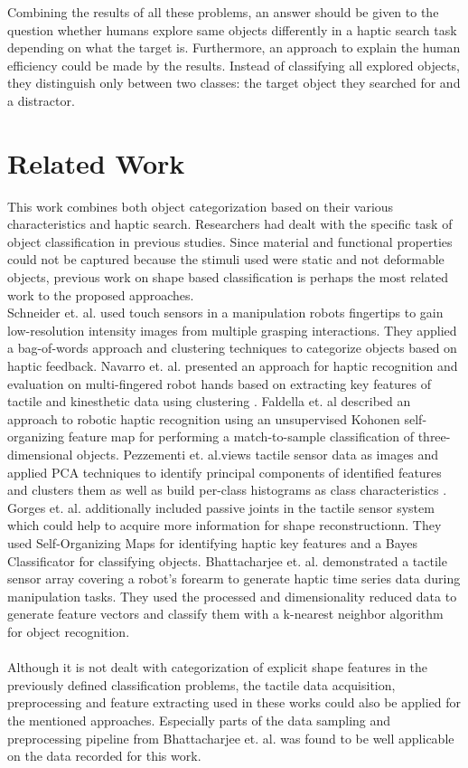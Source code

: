 Combining the results of all these problems, an answer should be given to the question whether humans explore same objects differently in a haptic search task depending on what the target is. Furthermore, an approach to explain the human efficiency could be made by the results. Instead of classifying all explored objects, they distinguish only between two classes: the target object they searched for and a distractor.      
\section{Related Work}
This work combines both object categorization based on their various characteristics and haptic search. Researchers had dealt with the specific task of object classification in previous studies. Since material and functional properties could not be captured because the stimuli used were static and not deformable objects, previous work on shape based classification is perhaps the most related work to the proposed approaches.\\
Schneider et. al. \cite{Schneider} used touch sensors in a manipulation robots fingertips to gain low-resolution intensity images from multiple grasping interactions. They applied a bag-of-words approach and clustering techniques to categorize objects based on haptic feedback. Navarro et. al. presented an approach for haptic recognition and evaluation on multi-fingered robot hands based on extracting key features of tactile and kinesthetic data using clustering \cite{Navarro}. Faldella et. al \cite{Faldella} described an approach to robotic haptic recognition using an unsupervised Kohonen self-organizing feature map for performing a match-to-sample classification of three-dimensional objects. Pezzementi et. al.views tactile sensor data as images and applied PCA techniques to identify principal components of identified features and clusters them as well as build per-class histograms as class characteristics \cite{Pezzementi}. Gorges et. al. \cite{Gorges} additionally included passive joints in the tactile sensor system which could help to acquire more information for shape reconstructionn. They used Self-Organizing Maps for identifying haptic key features and a Bayes Classificator for classifying objects. Bhattacharjee et. al. \cite{Bhattacharjee} demonstrated a tactile sensor array covering a robot's forearm to generate haptic time series data during manipulation tasks. They used the processed and dimensionality reduced data to generate feature vectors and classify them with a k-nearest neighbor algorithm for object recognition.
\\\\
Although it is not dealt with categorization of explicit shape features in the previously defined classification problems, the tactile data acquisition, preprocessing and feature extracting used in these works could also be applied for the mentioned approaches. Especially parts of the data sampling and preprocessing pipeline from Bhattacharjee et. al. \cite{Bhattacharjee} was found to be well applicable on the data recorded for this work.

